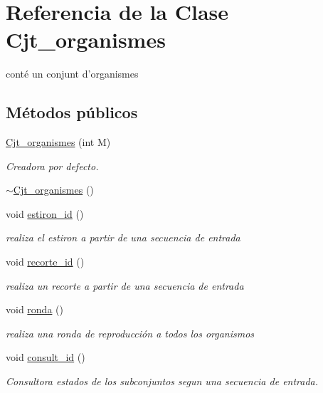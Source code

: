 \hypertarget{class_cjt__organismes}{\section{Referencia de la Clase Cjt\-\_\-organismes}
\label{class_cjt__organismes}
}


conté un conjunt d'organismes  


\subsection*{Métodos públicos}
\begin{DoxyCompactItemize}
\item 
\hyperlink{class_cjt__organismes_aeef5a3310bf21961ed1976585c531a75}{Cjt\-\_\-organismes} (int M)
\begin{DoxyCompactList}\small\item\em Creadora por defecto. \end{DoxyCompactList}\item 
\hyperlink{class_cjt__organismes_ae4c9a822f84e06f17f3e58c0747fd2ff}{$\sim$\-Cjt\-\_\-organismes} ()
\item 
void \hyperlink{class_cjt__organismes_a32f1d55b2e11f6f724e22f305712d3a1}{estiron\-\_\-id} ()
\begin{DoxyCompactList}\small\item\em realiza el estiron a partir de una secuencia de entrada \end{DoxyCompactList}\item 
void \hyperlink{class_cjt__organismes_a1371e1548ced329200f3f6bba7765dc7}{recorte\-\_\-id} ()
\begin{DoxyCompactList}\small\item\em realiza un recorte a partir de una secuencia de entrada \end{DoxyCompactList}\item 
void \hyperlink{class_cjt__organismes_a8d1560fce4ecc7519cb7716694b85d59}{ronda} ()
\begin{DoxyCompactList}\small\item\em realiza una ronda de reproducción a todos los organismos \end{DoxyCompactList}\item 
void \hyperlink{class_cjt__organismes_a0c8bed8ae75e0d8ff377be4ca1ee05bc}{consult\-\_\-id} ()
\begin{DoxyCompactList}\small\item\em Consultora estados de los subconjuntos segun una secuencia de entrada. \end{DoxyCompactList}\item 

\end{DoxyCompactItemize}
